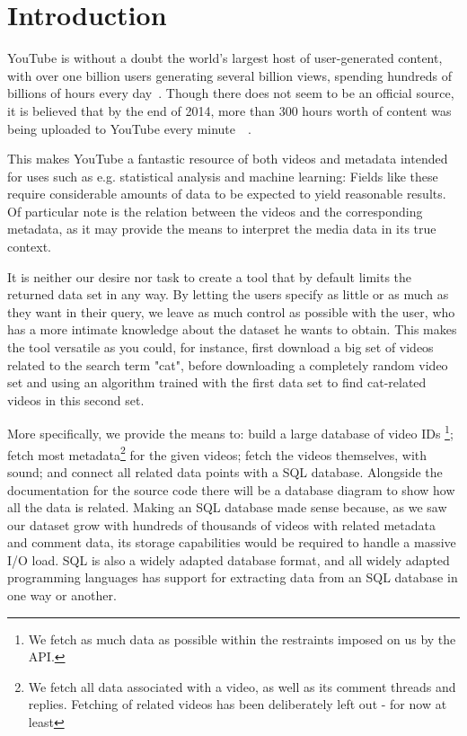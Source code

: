 
\section{Introduction}

YouTube is without a doubt the world's largest host of user-generated content,
with over one billion users generating several billion views, spending hundreds
of billions of hours every day~\cite{officialstats}. Though there does not seem
to be an official source, it is believed that by the end of 2014, more than 300
hours worth of content was being uploaded to YouTube every
minute~\cite{dagensmediastats}~\cite{reelseostats}. 

This makes YouTube a fantastic resource of both videos and metadata intended for
uses such as e.g. statistical analysis and machine learning: Fields like these
require considerable amounts of data to be expected to yield reasonable results.
Of particular note is the relation between the videos and the corresponding 
metadata, as it may provide the means to interpret the media data in its true
context.

It is neither our desire nor task to create a tool that by default limits the
returned data set in any way. By letting the users specify as little or as much
as they want in their query, we leave as much control as possible with the user,
who has a more intimate knowledge about the dataset he wants to obtain.
This makes the tool versatile as you could, for instance, first
download a big set of videos related to the search term "cat", before
downloading a completely random video set and using an algorithm trained with
the first data set to find cat-related videos in this second set. 

More specifically, we provide the means to: build a large database of video IDs
\footnote{We fetch as much data as possible within the restraints imposed
on us by the API.}; fetch most metadata\footnote{We fetch all data associated
with a video, as well as its comment threads and replies. Fetching of related
videos has been deliberately left out - for now at least} for the given videos;
fetch the videos themselves, with sound; and connect all related data points
with a SQL database. Alongside the documentation for the source code there will
be a database diagram to show how all the data is related. Making an SQL database
made sense because, as we saw our dataset grow with hundreds of thousands of
videos with related metadata and comment data, its storage capabilities
would be required
to handle a massive I/O load. SQL is also a widely adapted database
format, and all widely adapted programming languages has support for
extracting data from an SQL database in one way or another.

